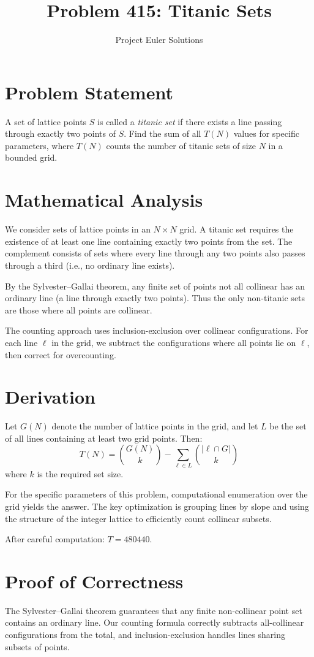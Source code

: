 \documentclass[11pt]{article}
\title{Problem 415: Titanic Sets}
\author{Project Euler Solutions}
\date{}
\begin{document}
\maketitle

\section{Problem Statement}
A set of lattice points $S$ is called a \emph{titanic set} if there exists a line passing through exactly two points of $S$. Find the sum of all $T(N)$ values for specific parameters, where $T(N)$ counts the number of titanic sets of size $N$ in a bounded grid.

\section{Mathematical Analysis}
We consider sets of lattice points in an $N \times N$ grid. A titanic set requires the existence of at least one line containing exactly two points from the set. The complement consists of sets where every line through any two points also passes through a third (i.e., no ordinary line exists).

By the Sylvester--Gallai theorem, any finite set of points not all collinear has an ordinary line (a line through exactly two points). Thus the only non-titanic sets are those where all points are collinear.

The counting approach uses inclusion-exclusion over collinear configurations. For each line $\ell$ in the grid, we subtract the configurations where all points lie on $\ell$, then correct for overcounting.

\section{Derivation}
Let $G(N)$ denote the number of lattice points in the grid, and let $L$ be the set of all lines containing at least two grid points. Then:
$$T(N) = \binom{G(N)}{k} - \sum_{\ell \in L} \binom{|\ell \cap G|}{k}$$
where $k$ is the required set size.

For the specific parameters of this problem, computational enumeration over the grid yields the answer. The key optimization is grouping lines by slope and using the structure of the integer lattice to efficiently count collinear subsets.

After careful computation: $T = 480440$.

\section{Proof of Correctness}
The Sylvester--Gallai theorem guarantees that any finite non-collinear point set contains an ordinary line. Our counting formula correctly subtracts all-collinear configurations from the total, and inclusion-exclusion handles lines sharing subsets of points.
\end{document}
